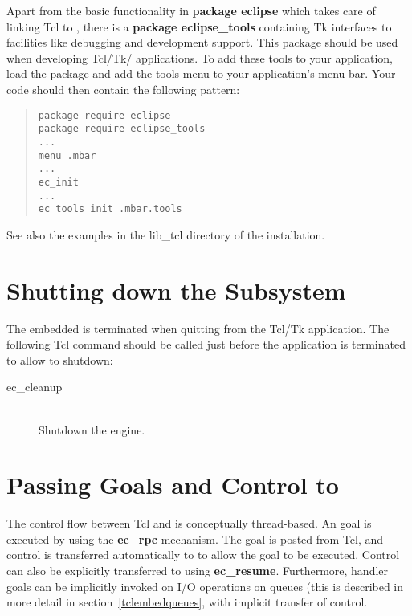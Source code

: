Apart from the basic functionality in {\bf package eclipse} which
takes care of linking Tcl to {\eclipse}, there is a
{\bf package eclipse_tools} containing Tk interfaces to
{\eclipse} facilities like debugging and development support.
This package should be used when developing Tcl/Tk/{\eclipse} applications.
To add these tools to your application, load the package and add the
tools menu to your application's menu bar. Your code should then
contain the following pattern:
\begin{quote}\begin{verbatim}
package require eclipse
package require eclipse_tools
...
menu .mbar
...
ec_init
...
ec_tools_init .mbar.tools
\end{verbatim}\end{quote}
See also the examples in the lib_tcl directory of the {\eclipse} installation.


\section{Shutting down the {\eclipse} Subsystem}

The embedded {\eclipse} is terminated when quitting from the Tcl/Tk
application. The following Tcl command should be called just before the
application is terminated to allow {\eclipse} to shutdown:

\begin{description}
\item[ec_cleanup]\ \\
        Shutdown the {\eclipse} engine. 
\end{description}

\section{Passing Goals and Control to \eclipse}
The control flow between Tcl and {\eclipse} is conceptually thread-based.
An {\eclipse} goal is executed by using the {\bf ec_rpc} mechanism. The
goal is posted from Tcl, and control is transferred automatically to
{\eclipse} to allow the goal to be executed. Control can also be explicitly
transferred to {\eclipse} using {\bf ec_resume}. Furthermore, handler goals
can be implicitly invoked on I/O operations on queues (this is described in
more detail in section~\ref{tclembedqueues}, with implicit
transfer of control.

